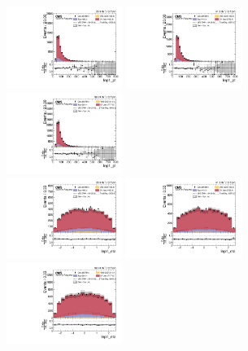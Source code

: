 \begin{figure}[!ht]
  \centering
  \includegraphics[width=0.335\textwidth]{analysis_plots/2016_zjj/cr_vjets_m/lep1_pt.pdf} \hspace{-10pt}
  \includegraphics[width=0.335\textwidth]{analysis_plots/2017_zjj/cr_vjets_m/lep1_pt.pdf} \hspace{-10pt}
  \includegraphics[width=0.335\textwidth]{analysis_plots/2018_zjj/cr_vjets_m/lep1_pt.pdf} \hspace{-10pt} \\
  \includegraphics[width=0.335\textwidth]{analysis_plots/2016_zjj/cr_vjets_m/lep1_eta.pdf} \hspace{-10pt}
  \includegraphics[width=0.335\textwidth]{analysis_plots/2017_zjj/cr_vjets_m/lep1_eta.pdf} \hspace{-10pt}
  \includegraphics[width=0.335\textwidth]{analysis_plots/2018_zjj/cr_vjets_m/lep1_eta.pdf} \hspace{-10pt} \\

\end{figure}
